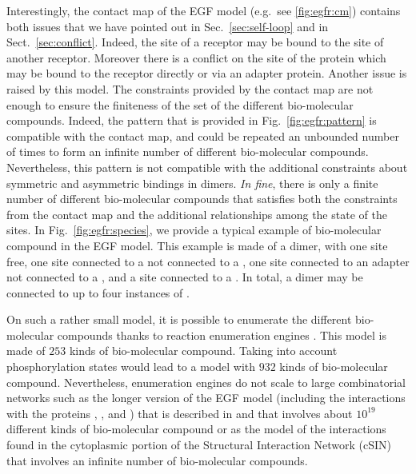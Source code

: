 \documentclass{entcs}
\begin{document}
Interestingly, the contact map of the EGF model (e.g.~see \ref{fig:egfr:cm})
contains both issues that we have pointed out in Sec.~\ref{sec:self-loop} and in Sect.~\ref{sec:conflict}. Indeed, the site  of a receptor may be bound to the site  of another receptor. Moreover there is a conflict on the site  of the protein  which may be bound to the receptor directly
or via an adapter protein. Another issue is raised by this model.
The constraints provided by the contact map are not enough to ensure the finiteness of the set of the different bio-molecular compounds. Indeed,
the pattern that is provided in Fig.~\ref{fig:egfr:pattern} is compatible with the contact map, and could be repeated an unbounded number of times to form an infinite number of different bio-molecular compounds. Nevertheless, this pattern is not compatible with the additional constraints about symmetric and asymmetric bindings in dimers. \emph{In fine}, there is only a finite number of different bio-molecular compounds that satisfies both
the constraints from the contact map and the additional relationships among the state of the sites. In Fig.~\ref{fig:egfr:species}, we provide a typical example of bio-molecular compound in the EGF model. This example is made of a dimer, with one site  free, one site  connected to a  not connected to a , one site  connected to an adapter not connected to a , and a site  connected to a . In total, a dimer may be connected to up to four instances of .

On such a rather small model, it is possible to enumerate the different bio-molecular compounds thanks to reaction enumeration engines  \cite{BNGL,KaDe}. This model is made of $253$ kinds of bio-molecular compound.
Taking into account phosphorylation states would lead to a model
with $932$ kinds of bio-molecular compound. Nevertheless, enumeration engines do not scale to large combinatorial networks such as the longer version of the EGF model (including the interactions with the proteins , , and ) that is described in \cite{DanosEtAl-CONCUR07} and that involves about $10^{19}$ different kinds of bio-molecular compound \cite{DanosEtAl-VMCAI08} or as the model of the interactions found in the cytoplasmic portion of the Structural Interaction Network (cSIN) \cite{Deeds-et-al-plosone2012,Kim} that involves an infinite number of bio-molecular compounds.
\end{document}
